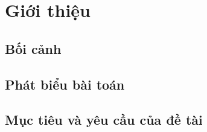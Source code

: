 \section{Giới thiệu}
\label{sec:introduction}


\subsection{Bối cảnh}

\subsection{Phát biểu bài toán}

\subsection{Mục tiêu và yêu cầu của đề tài}

